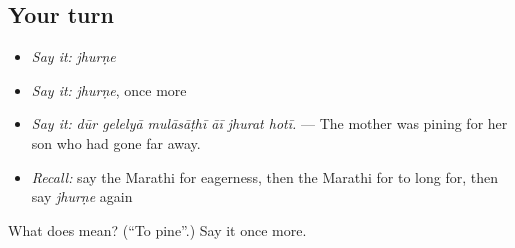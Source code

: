 \subsection*{Your turn}
\begin{itemize}
\raggedright
  \item \emph{Say it:} \emph{jhurṇe}
  \item \emph{Say it:} \emph{jhurṇe}, once more
  \item \emph{Say it:} \emph{dūr gelelyā mulāsāṭhī āī jhurat hotī.} — The mother was pining for her son who had gone far away.
  \item \emph{Recall:} say the Marathi for eagerness, then the Marathi for to long for, then say \emph{jhurṇe} again
\end{itemize}

\begin{tcolorbox}[breakable,colback=teal!4,colframe=teal!35!black,title={Before you move on}]
What does  mean? (\textquotedblleft{}To pine\textquotedblright{}.) Say it once more.
\end{tcolorbox}
